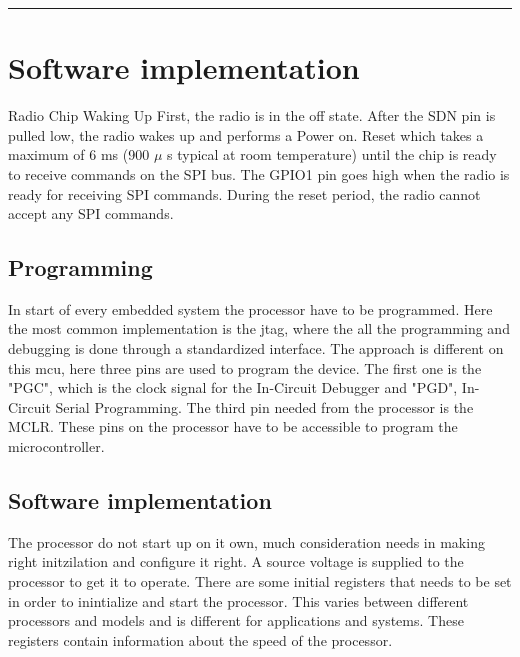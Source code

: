 \vspace{-10ex}%
\rule{\textwidth}{0.3pt}
\vspace{10ex}

\section{Software implementation} %

Radio Chip Waking Up First,  the  radio  is  in  the  off  state. After  the  SDN  pin  is  pulled  low,  the  radio  wakes  up  and  performs  a  Power  on.
Reset  which  takes  a  maximum  of  6 ms  (900 $\mu$ s  typical  at  room  temperature)  until  the  chip  is  ready  to  receive commands on the SPI bus. The GPIO1 pin goes high when the radio is ready for receiving SPI commands. During the reset period, the radio cannot accept any SPI commands. 

\subsection{Programming} 
In start of every embedded system the processor have to be programmed. Here the most common implementation is the \gls{jtag}, where the all the programming and debugging is done through a standardized interface. The approach is different on this \gls{mcu}, here three pins are used to program the device. The first one is the "PGC", which is the clock signal for the In-Circuit Debugger and "PGD", In-Circuit Serial Programming. The third pin needed from the processor is the MCLR. These pins on the processor have to be accessible to program the microcontroller. 


\subsection{Software implementation}
The processor do not start up on it own, much consideration needs in making right initzilation and configure it right. A source voltage is supplied to the processor to get it to operate. There are some initial registers that needs to be set in order to inintialize and start the processor. This varies between different processors and models and is different for applications and systems. These registers contain information about the speed of the processor.    

